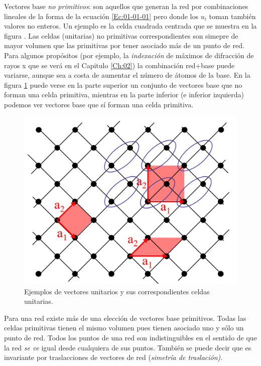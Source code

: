 \begin{definition}
    Vectores base {\it no primitivos}: son aquellos que generan la red por combinaciones lineales de la forma de la ecuación \ref{Ec:01-01-01} pero donde los $u_i$ toman también valores no enteros. Un ejemplo es la celda cuadrada centrada que se muestra en la figura . Las celdas (unitarias) no primitivas correspondientes son simepre de mayor volumen que las primitivas por tener asociado más de un punto de red. Para algunos propósitos (por ejemplo, la {\it indexación} de máximos de difracción de rayos x que se verá en el Capitulo \ref{Ch:02}) la combinación red+base puede variarse, aunque sea a costa de aumentar el número de átomos de la base. En la figura \ref{Fig:01-01} puede verse en la parte superior un conjunto de vectores base que no forman una celda primitiva, mientras en la parte inferior (e inferior izquierda) podemos ver vectores base que sí forman una celda primitiva.
\end{definition}


\begin{figure}[h!] \centering
    \includegraphics[scale=0.78]{Cuerpo/Ch_01/celda.png}
    \caption{Ejemplos de vectores unitarios y sus correspondientes celdas unitarias.}
    \label{Fig:01-01}
\end{figure}


\begin{definition}
    Para una red existe más de una elección de vectores base primitivos. Todas las celdas primitivas tienen el mismo volumen pues tienen asociado uno y sólo un punto de red. Todos los puntos de una red son indistinguibles en el sentido de que la red {\it se ve} igual desde cualquiera de sus puntos. También se puede decir que es invariante por traslacciones de vectores de red (\it{simetría de traslación}).          
\end{definition}

